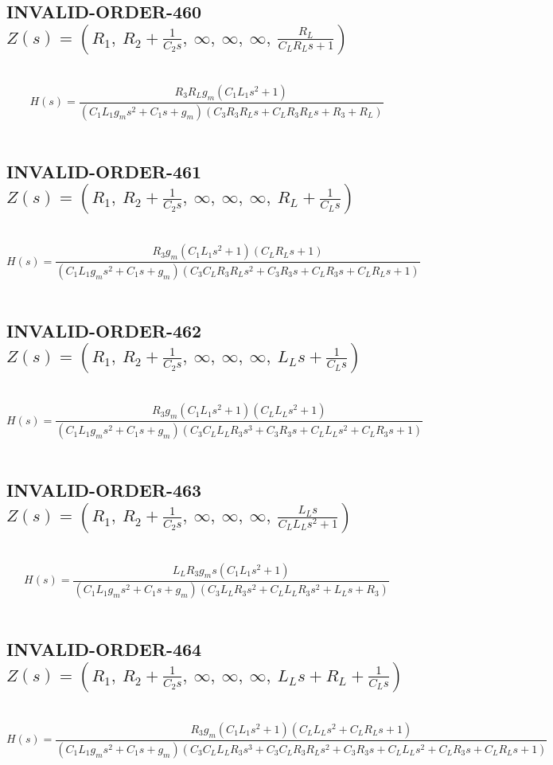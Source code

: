 \documentclass{article}
\begin{document}
\subsection{INVALID-ORDER-460 $Z(s) = \left( R_{1}, \  R_{2} + \frac{1}{C_{2} s}, \  \infty, \  \infty, \  \infty, \  \frac{R_{L}}{C_{L} R_{L} s + 1}\right)$ } \ 
\textbf{\[H(s) = \frac{R_{3} R_{L} g_{m} \left(C_{1} L_{1} s^{2} + 1\right)}{\left(C_{1} L_{1} g_{m} s^{2} + C_{1} s + g_{m}\right) \left(C_{3} R_{3} R_{L} s + C_{L} R_{3} R_{L} s + R_{3} + R_{L}\right)}\] } \ 
\subsection{INVALID-ORDER-461 $Z(s) = \left( R_{1}, \  R_{2} + \frac{1}{C_{2} s}, \  \infty, \  \infty, \  \infty, \  R_{L} + \frac{1}{C_{L} s}\right)$ } \ 
\textbf{\[H(s) = \frac{R_{3} g_{m} \left(C_{1} L_{1} s^{2} + 1\right) \left(C_{L} R_{L} s + 1\right)}{\left(C_{1} L_{1} g_{m} s^{2} + C_{1} s + g_{m}\right) \left(C_{3} C_{L} R_{3} R_{L} s^{2} + C_{3} R_{3} s + C_{L} R_{3} s + C_{L} R_{L} s + 1\right)}\] } \ 
\subsection{INVALID-ORDER-462 $Z(s) = \left( R_{1}, \  R_{2} + \frac{1}{C_{2} s}, \  \infty, \  \infty, \  \infty, \  L_{L} s + \frac{1}{C_{L} s}\right)$ } \ 
\textbf{\[H(s) = \frac{R_{3} g_{m} \left(C_{1} L_{1} s^{2} + 1\right) \left(C_{L} L_{L} s^{2} + 1\right)}{\left(C_{1} L_{1} g_{m} s^{2} + C_{1} s + g_{m}\right) \left(C_{3} C_{L} L_{L} R_{3} s^{3} + C_{3} R_{3} s + C_{L} L_{L} s^{2} + C_{L} R_{3} s + 1\right)}\] } \ 
\subsection{INVALID-ORDER-463 $Z(s) = \left( R_{1}, \  R_{2} + \frac{1}{C_{2} s}, \  \infty, \  \infty, \  \infty, \  \frac{L_{L} s}{C_{L} L_{L} s^{2} + 1}\right)$ } \ 
\textbf{\[H(s) = \frac{L_{L} R_{3} g_{m} s \left(C_{1} L_{1} s^{2} + 1\right)}{\left(C_{1} L_{1} g_{m} s^{2} + C_{1} s + g_{m}\right) \left(C_{3} L_{L} R_{3} s^{2} + C_{L} L_{L} R_{3} s^{2} + L_{L} s + R_{3}\right)}\] } \ 
\subsection{INVALID-ORDER-464 $Z(s) = \left( R_{1}, \  R_{2} + \frac{1}{C_{2} s}, \  \infty, \  \infty, \  \infty, \  L_{L} s + R_{L} + \frac{1}{C_{L} s}\right)$ } \ 
\textbf{\[H(s) = \frac{R_{3} g_{m} \left(C_{1} L_{1} s^{2} + 1\right) \left(C_{L} L_{L} s^{2} + C_{L} R_{L} s + 1\right)}{\left(C_{1} L_{1} g_{m} s^{2} + C_{1} s + g_{m}\right) \left(C_{3} C_{L} L_{L} R_{3} s^{3} + C_{3} C_{L} R_{3} R_{L} s^{2} + C_{3} R_{3} s + C_{L} L_{L} s^{2} + C_{L} R_{3} s + C_{L} R_{L} s + 1\right)}\] } \ 
\end{document}
